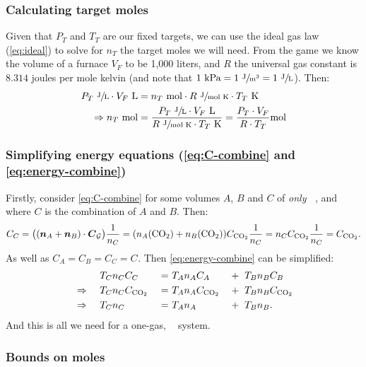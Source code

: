 \documentclass{article}
\DeclareMathOperator{\CDiox}{\mathrm{CO}_2}
\begin{document}
\subsubsection*{Calculating target moles}

Given that $P_T$ and $T_T$ are our fixed targets, we can use the ideal gas law (\autoref{eq:ideal})
to solve for $n_T$ the target moles we will need. From the game we know the volume of a furnace
$V_F$ to be 1,000 liters, and $R$ the universal gas constant is $8.314$ joules per mole kelvin (and
note that $1\ \text{kPa}=1\ \sfrac{\text{J}}{\text{m}^3}=1\ \sfrac{\text{J}}{\text{L}}$). Then:
\begin{align}
    P_T\ \sfrac{\text{J}}{\text{L}}\cdot V_F\ \text{L}
    &= n_T\ \text{mol}\cdot R\ \sfrac{\text{J}}{\text{mol}\ \text{K}}\cdot T_T\ \text{K} \notag \\
    \Rightarrow
    n_T\ \text{mol}
    &= \frac
        {P_T\ \sfrac{\text{J}}{\text{L}}\cdot V_F\ \text{L}}
        {R\ \sfrac{\text{J}}{\text{mol}\ \text{K}}\cdot T_T\ \text{K}}
    = \frac{P_T\cdot V_F}{R\cdot T_T}\text{mol}
\end{align}

\subsubsection*{Simplifying energy equations (\autoref{eq:C-combine} and \autoref{eq:energy-combine})}

Firstly, consider \autoref{eq:C-combine} for some volumes $A$, $B$ and $C$ of \emph{only} $\CDiox$,
and where $C$ is the combination of $A$ and $B$. Then:
\[
    C_C
    = \big((\vec{n}_A+\vec{n}_B)\cdot\vec{C}_{\calG}\big)\frac{1}{n_C}
    = (n_A(\CDiox)+n_B(\CDiox))C_{\CDiox}\frac{1}{n_C}
    = n_C C_{\CDiox}\frac{1}{n_C}
    = C_{\CDiox}.
\]
As well as $C_A=C_B=C_C=C_{\CDiox}$. Then \autoref{eq:energy-combine} can be simplified:
\begin{alignat}{4}
    &\phantom{\Rightarrow} &
    &\ T_C n_C C_C &
    \ = &\ T_A n_A C_A & &+\ T_B n_B C_B \notag \\
    &\Rightarrow &
    &\ T_C n_C C_{\CDiox} &
    \ = &\ T_A n_A C_{\CDiox} & &+\ T_B n_B C_{\CDiox} \notag \\
    &\Rightarrow &
    &\ T_C n_C &
    \ = &\ T_A n_A & &+\ T_B n_B.
    \label{eq:T-combine}
\end{alignat}
And this is all we need for a one-gas, $\CDiox$ system.

\subsubsection*{Bounds on moles}
\end{document}
